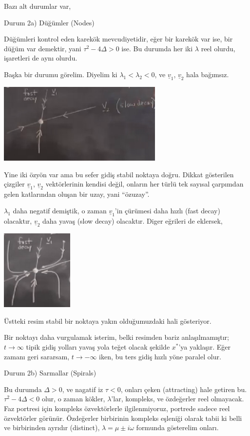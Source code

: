 \documentclass[12pt,fleqn]{article}\usepackage{../../common}
\begin{document}
Bazı alt durumlar var,

Durum 2a) Düğümler (Nodes)

Düğümleri kontrol eden karekök mevcudiyetidir, eğer bir karekök var ise, bir
düğüm var demektir, yani $\tau^2 - 4\Delta > 0$ ise. Bu durumda her iki
$\lambda$ reel olurdu, işaretleri de aynı olurdu.

Başka bir durumu görelim. Diyelim ki $\lambda_1 < \lambda_2 < 0$, ve
$\underline{v}_1$, $\underline{v}_2$ hala bağımsız.

\includegraphics[height=4cm]{05_11.png}

Yine iki özyön var ama bu sefer gidiş stabil noktaya doğru. Dikkat gösterilen
çizgiler $\underline{v}_1$, $\underline{v}_2$ vektörlerinin kendisi değil, onların
her türlü tek sayısal çarpımdan gelen katlarından oluşan bir uzay, yani
``özuzay''.

$\lambda_1$ daha negatif demiştik, o zaman $\underline{v}_1$'in çürümesi daha
hızlı (fast decay) olacaktır, $\underline{v}_2$ daha yavaş (slow decay)
olacaktır. Diger eğrileri de eklersek,

\includegraphics[height=4cm]{05_12.png}

Üstteki resim stabil bir noktaya yakın olduğumuzdaki hali gösteriyor.

Bir noktayı daha vurgulamak isterim, belki resimden bariz anlaşılmamıştır;
$t\to\infty$ tipik gidiş yolları yavaş yola teğet olacak şekilde $x^*$'ya
yaklaşır. Eğer zamanı geri sararsam, $t\to-\infty$ iken, bu ters gidiş hızlı
yöne paralel olur.

Durum 2b) Sarmallar (Spirals)

Bu durumda $\Delta > 0$, ve nagatif iz $\tau < 0$, onları çeken (attracting)
hale getiren bu. $\tau^2 - 4\Delta < 0$ olur, o zaman kökler, $\lambda$'lar,
kompleks, ve özdeğerler reel olmayacak. Faz portresi için kompleks özvektörlerle
ilgilenmiyoruz, portrede sadece reel özvektörler görünür. Özdeğerler birbirinin
kompleks eşleniği olarak tabii ki belli ve birbirinden ayrıdır (distinct),
$\lambda = \mu \pm i\omega$ formunda gösterelim onları.
\end{document}
